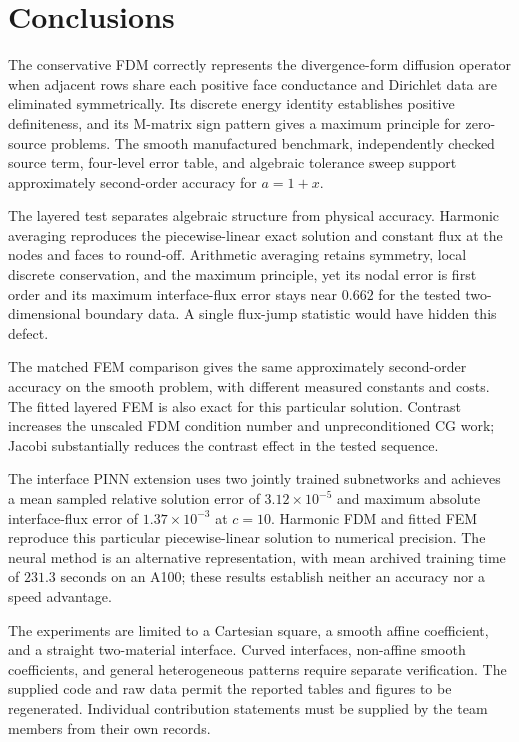 \section{Conclusions}
The conservative FDM correctly represents the divergence-form diffusion
operator when adjacent rows share each positive face conductance and
Dirichlet data are eliminated symmetrically. Its discrete energy identity
establishes positive definiteness, and its M-matrix sign pattern gives a
maximum principle for zero-source problems. The smooth manufactured benchmark, independently
checked source term, four-level error table, and algebraic tolerance sweep
support approximately second-order accuracy for $a=1+x$.

The layered test separates algebraic structure from physical accuracy.
Harmonic averaging reproduces the piecewise-linear exact solution and
constant flux at the nodes and faces to round-off. Arithmetic averaging
retains symmetry, local discrete conservation, and the maximum principle,
yet its nodal error is first order and its maximum interface-flux error
stays near $0.662$ for the tested two-dimensional boundary data. A single
flux-jump statistic would have hidden this defect.

The matched FEM comparison gives the same approximately second-order accuracy
on the smooth problem, with different measured constants and costs. The
fitted layered FEM is also exact for this particular solution. Contrast
increases the unscaled FDM condition number and unpreconditioned CG work;
Jacobi substantially reduces the contrast effect in the tested sequence.

The interface PINN extension uses two jointly trained subnetworks and
achieves a mean sampled relative solution error of $3.12\times10^{-5}$
and maximum absolute interface-flux error of $1.37\times10^{-3}$ at $c=10$.
Harmonic FDM and fitted FEM reproduce this particular piecewise-linear
solution to numerical precision. The neural method is an alternative
representation, with mean archived training time of $231.3$ seconds on an
A100; these results establish neither an accuracy nor a speed advantage.

The experiments are limited to a Cartesian square, a smooth affine
coefficient, and a straight two-material interface. Curved interfaces,
non-affine smooth coefficients, and general heterogeneous patterns require
separate verification. The supplied code and raw data permit the reported
tables and figures to be regenerated. Individual contribution statements
must be supplied by the team members from their own records.
